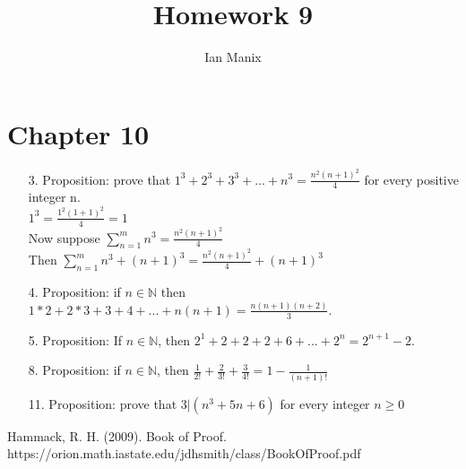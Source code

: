 \documentclass[sigconf]{article}
\title{
  \textbf{Homework 9} \\
  }
\author{ 
  Ian Manix
  }
\begin{document}



\maketitle




\section*{Chapter 10}
\begin{itemize}
  \item[3.] Proposition: prove that $1^3 + 2^3 + 3^3 + ... + n^3=\frac{n^2(n+1)^2}{4}$ for every positive integer n.\\
            $1^3=\frac{1^2(1+1)^2}{4}=1$\\
            Now suppose $\sum_{n=1}^{m}n^3=\frac{n^2(n+1)^2}{4}$\\
            Then $\sum_{n=1}^{m}n^3+(n+1)^3=\frac{n^2(n+1)^2}{4}+(n+1)^3$\\


  \item[4.] Proposition: if $n\in\mathbb{N}$ then $1*2+2*3+3+4+...+n(n+1)=\frac{n(n+1)(n+2)}{3}$.\\

  \item[5.] Proposition: If $n\in\mathbb{N}$, then $2^1+2+2+2+6+...+2^n=2^{n+1}-2$.\\

  \item[8.] Proposition: if $n\in\mathbb{N}$, then $\frac{1}{2!}+\frac{2}{3!}+\frac{3}{4!}=1-\frac{1}{(n+1)!}$\\

  \item[11.] Proposition: prove that $3|(n^3+5n+6)$ for every integer $n\geq 0$\\

\end{itemize}


Hammack, R. H. (2009). Book of Proof.\\ https://orion.math.iastate.edu/jdhsmith/class/BookOfProof.pdf



\end{document}
